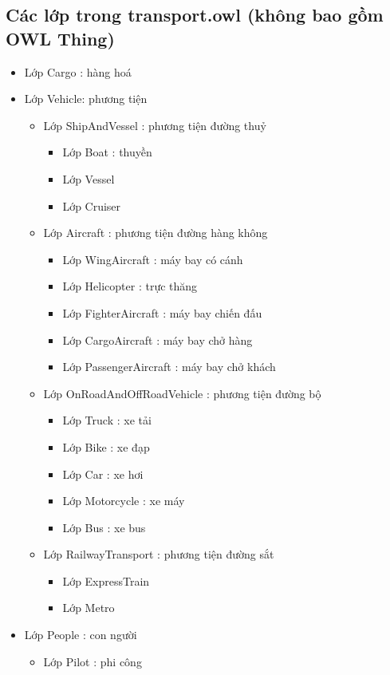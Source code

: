 \subsection{Các lớp trong transport.owl (không bao gồm OWL Thing)}
\begin{itemize}
\item Lớp Cargo : hàng hoá
\item Lớp Vehicle: phương tiện
		\begin{itemize}
		\item Lớp ShipAndVessel : phương tiện đường thuỷ
			\begin{itemize}
			\item Lớp Boat : thuyền
			\item Lớp Vessel
			\item Lớp Cruiser
			\end{itemize}
		\item Lớp Aircraft : phương tiện đường hàng không
			\begin{itemize}
			\item Lớp WingAircraft : máy bay có cánh
			\item Lớp Helicopter : trực thăng 
			\item Lớp FighterAircraft : máy bay chiến đấu
			\item Lớp CargoAircraft : máy bay chở hàng
			\item Lớp PassengerAircraft : máy bay chở khách
			\end{itemize}
		\item Lớp OnRoadAndOffRoadVehicle : phương tiện đường bộ
			\begin{itemize}
				\item Lớp Truck : xe tải
				\item Lớp Bike : xe đạp
				\item Lớp Car : xe hơi
				\item Lớp Motorcycle : xe máy
				\item Lớp Bus : xe bus
			\end{itemize}	
		\item Lớp RailwayTransport : phương tiện đường sắt
			\begin{itemize}
				\item Lớp ExpressTrain
				\item Lớp Metro
			\end{itemize}
		\end{itemize}
\item Lớp People : con người
	\begin{itemize}
	\item Lớp Pilot : phi công

\end{itemize}
\end{itemize}

